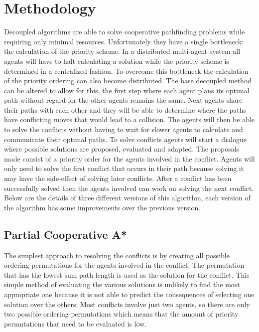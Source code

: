 \section{Methodology}\label{sec:method}
Decoupled algorithms are able to solve cooperative pathfinding problems while
requiring only minimal resources. Unfortunately they have a single bottleneck:
the calculation of the priority scheme. In a distributed multi-agent system all
agents will have to halt calculating a solution while the priority scheme is
determined in a centralized fashion. To overcome this bottleneck the
calculation of the
priority ordering can also become distributed. The base decoupled method can be
altered to allow for this, the first step where each agent plans its optimal
path without regard for the other agents remains the same. Next agents share
their paths with each other and they will be able to determine where the paths
have conflicting moves that would lead to a collision. The agents will then be
able to solve the conflicts without having to wait for slower agents to
calculate and communicate their optimal paths. To solve conflicts agents will
start a dialogue where possible solutions are proposed, evaluated and adapted.
The proposals made consist of a priority order for the agents involved in the
conflict. Agents will only need to solve the first conflict that occurs in
their path because solving it may have the side-effect of solving later
conflicts. After a conflict has been successfully solved then the agents
involved can work on solving the next conflict.
Below are the details of three different versions of this algorithm, each
version of the algorithm has some improvements over the previous version.

\subsection{Partial Cooperative A*}
The simplest approach to resolving the conflicts is by creating all possible
ordering permutations for the agents involved in the conflict. The permutation
that has the lowest sum path length is used as the solution for the conflict.
This simple method of evaluating the various solutions is unlikely to find the
most appropriate one because it is not able to predict the consequences of
selecting one solution over the others.
Most conflicts involve just two agents, so there are only two possible ordering
permutations which means that the amount of priority permutations that need to
be evaluated is low.

